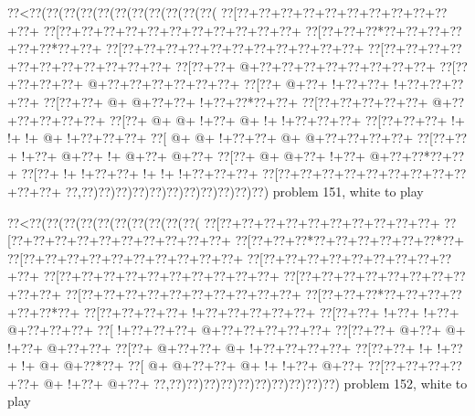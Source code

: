 \vbox{\vbox{\goo
\0??<\0??(\0??(\0??(\0??(\0??(\0??(\0??(\0??(\0??(\0??(\0??(
\0??[\0??+\0??+\0??+\0??+\0??+\0??+\0??+\0??+\0??+\0??+\0??+
\0??[\0??+\0??+\0??+\0??+\0??+\0??+\0??+\0??+\0??+\0??+\0??+
\0??[\0??+\0??+\0??*\0??+\0??+\0??+\0??+\0??+\0??*\0??+\0??+
\0??[\0??+\0??+\0??+\0??+\0??+\0??+\0??+\0??+\0??+\0??+\0??+
\0??[\0??+\0??+\0??+\0??+\0??+\0??+\0??+\0??+\0??+\0??+\0??+
\0??[\0??+\0??+\- @+\0??+\0??+\0??+\0??+\0??+\0??+\0??+\0??+
\0??[\0??+\0??+\0??+\0??+\- @+\0??+\0??+\0??+\0??+\0??+\0??+
\0??[\0??+\- @+\0??+\- !+\0??+\0??+\- !+\0??+\0??+\0??+\0??+
\0??[\0??+\0??+\- @+\- @+\0??+\0??+\- !+\0??+\0??*\0??+\0??+
\0??[\0??+\0??+\0??+\0??+\0??+\- @+\0??+\0??+\0??+\0??+\0??+
\0??[\0??+\- @+\- @+\- !+\0??+\- @+\- !+\- !+\0??+\0??+\0??+
\0??[\0??+\0??+\0??+\- !+\- !+\- !+\- @+\- !+\0??+\0??+\0??+
\0??[\- @+\- @+\- !+\0??+\0??+\- @+\- @+\0??+\0??+\0??+\0??+
\0??[\0??+\0??+\- !+\0??+\- @+\0??+\- !+\- @+\0??+\- @+\0??+
\0??[\0??+\- @+\- @+\0??+\- !+\0??+\- @+\0??+\0??*\0??+\0??+
\0??[\0??+\- !+\- !+\0??+\0??+\- !+\- !+\- !+\0??+\0??+\0??+
\0??[\0??+\0??+\0??+\0??+\0??+\0??+\0??+\0??+\0??+\0??+\0??+
\0??,\0??)\0??)\0??)\0??)\0??)\0??)\0??)\0??)\0??)\0??)\0??)
}
\hfil problem 151, white to play\hfil\break
}

\vbox{\vbox{\goo
\0??<\0??(\0??(\0??(\0??(\0??(\0??(\0??(\0??(\0??(\0??(
\0??[\0??+\0??+\0??+\0??+\0??+\0??+\0??+\0??+\0??+\0??+
\0??[\0??+\0??+\0??+\0??+\0??+\0??+\0??+\0??+\0??+\0??+
\0??[\0??+\0??+\0??*\0??+\0??+\0??+\0??+\0??+\0??*\0??+
\0??[\0??+\0??+\0??+\0??+\0??+\0??+\0??+\0??+\0??+\0??+
\0??[\0??+\0??+\0??+\0??+\0??+\0??+\0??+\0??+\0??+\0??+
\0??[\0??+\0??+\0??+\0??+\0??+\0??+\0??+\0??+\0??+\0??+
\0??[\0??+\0??+\0??+\0??+\0??+\0??+\0??+\0??+\0??+\0??+
\0??[\0??+\0??+\0??+\0??+\0??+\0??+\0??+\0??+\0??+\0??+
\0??[\0??+\0??+\0??*\0??+\0??+\0??+\0??+\0??+\0??*\0??+
\0??[\0??+\0??+\0??+\0??+\- !+\0??+\0??+\0??+\0??+\0??+
\0??[\0??+\0??+\- !+\0??+\- !+\0??+\- @+\0??+\0??+\0??+
\0??[\- !+\0??+\0??+\0??+\- @+\0??+\0??+\0??+\0??+\0??+
\0??[\0??+\0??+\- @+\0??+\- @+\- !+\0??+\- @+\0??+\0??+
\0??[\0??+\- @+\0??+\0??+\- @+\- !+\0??+\0??+\0??+\0??+
\0??[\0??+\0??+\- !+\- !+\0??+\- !+\- @+\- @+\0??*\0??+
\0??[\- @+\- @+\0??+\0??+\- @+\- !+\- !+\0??+\- @+\0??+
\0??[\0??+\0??+\0??+\0??+\0??+\- @+\- !+\0??+\- @+\0??+
\0??,\0??)\0??)\0??)\0??)\0??)\0??)\0??)\0??)\0??)\0??)
}
\hfil problem 152, white to play\hfil\break
}


